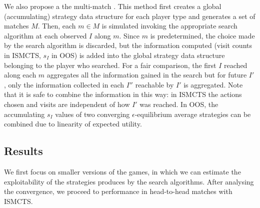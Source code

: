\documentclass{aamas2015}
\newcommand{\defword}[1]{\textbf{\boldmath{#1}}}
\begin{document}
We also propose a the multi-match \defword{aggregate method}. 
This method first creates a global (accumulating) strategy data structure for each player type and generates a 
set of matches $M$. Then, each $m \in M$ is simulated invoking the appropriate search algorithm at each observed 
$I$ along $m$. 
Since $m$ is predetermined, the choice made by the search algorithm is discarded, but the information computed 
(visit counts in ISMCTS, $s_I$ in OOS) is added into the global strategy data structure belonging to the player
who searched. 
For a fair comparison, the first $I$ reached along each $m$ aggregates all the information gained in the search 
but for future $I'$, only the information collected in each $I''$ reachable by $I'$ is aggregated.
Note that it is safe to combine the information in this way: in ISMCTS the actions chosen and visits are independent of 
how $I'$ was reached. In OOS, the accumulating $s_I$ values of two converging $\epsilon$-equilibrium average 
strategies can be combined due to linearity of expected utility. 

\subsection{Results}

We first focus on smaller versions of the games, in which we can estimate the exploitability of the strategies produces by the search algorithms. After analysing the convergence, we proceed to performance in head-to-head matches with ISMCTS.
\end{document}
